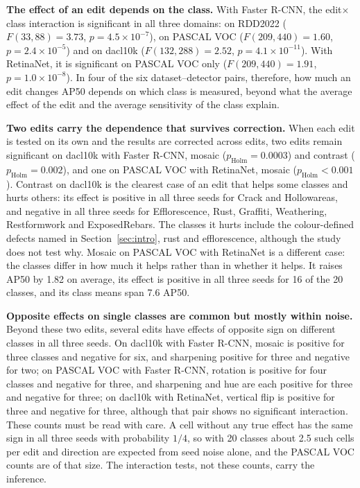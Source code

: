 \noindent\textbf{The effect of an edit depends on the class.} With Faster R-CNN, the edit$\times$class interaction is significant in all three domains: on RDD2022 ($F(33,88)=3.73$, $p=4.5\times10^{-7}$), on PASCAL VOC ($F(209,440)=1.60$, $p=2.4\times10^{-5}$) and on dacl10k ($F(132,288)=2.52$, $p=4.1\times10^{-11}$). With RetinaNet, it is significant on PASCAL VOC only ($F(209,440)=1.91$, $p=1.0\times10^{-8}$). In four of the six dataset--detector pairs, therefore, how much an edit changes AP50 depends on which class is measured, beyond what the average effect of the edit and the average sensitivity of the class explain.

\noindent\textbf{Two edits carry the dependence that survives correction.} When each edit is tested on its own and the results are corrected across edits, two edits remain significant on dacl10k with Faster R-CNN, mosaic ($p_{\mathrm{Holm}}=0.0003$) and contrast ($p_{\mathrm{Holm}}=0.002$), and one on PASCAL VOC with RetinaNet, mosaic ($p_{\mathrm{Holm}}<0.001$). Contrast on dacl10k is the clearest case of an edit that helps some classes and hurts others: its effect is positive in all three seeds for Crack and Hollowareas, and negative in all three seeds for Efflorescence, Rust, Graffiti, Weathering, Restformwork and ExposedRebars. The classes it hurts include the colour-defined defects named in Section~\ref{sec:intro}, rust and efflorescence, although the study does not test why. Mosaic on PASCAL VOC with RetinaNet is a different case: the classes differ in how much it helps rather than in whether it helps. It raises AP50 by 1.82 on average, its effect is positive in all three seeds for 16 of the 20 classes, and its class means span 7.6 AP50.

\noindent\textbf{Opposite effects on single classes are common but mostly within noise.} Beyond these two edits, several edits have effects of opposite sign on different classes in all three seeds. On dacl10k with Faster R-CNN, mosaic is positive for three classes and negative for six, and sharpening positive for three and negative for two; on PASCAL VOC with Faster R-CNN, rotation is positive for four classes and negative for three, and sharpening and hue are each positive for three and negative for three; on dacl10k with RetinaNet, vertical flip is positive for three and negative for three, although that pair shows no significant interaction. These counts must be read with care. A cell without any true effect has the same sign in all three seeds with probability $1/4$, so with 20 classes about 2.5 such cells per edit and direction are expected from seed noise alone, and the PASCAL VOC counts are of that size. The interaction tests, not these counts, carry the inference.

